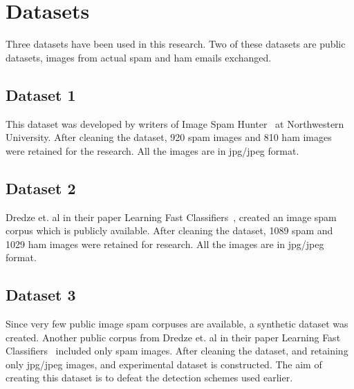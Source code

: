 \chapter{Datasets}
Three datasets have been used in this research. Two of these datasets are public datasets, images from actual spam and ham emails exchanged. 

\section{Dataset 1}
This dataset was developed by writers of Image Spam Hunter~\cite{3} at Northwestern University. After cleaning the dataset, 920 spam images and 810 ham images were retained for the research. All the images are in jpg/jpeg format.

\section{Dataset 2}
Dredze et. al in their paper Learning Fast Classifiers~\cite{10}, created an image spam corpus which is publicly available. After cleaning the dataset,  
1089 spam and 1029 ham images were retained for research. All the images are in jpg/jpeg format.

\section{Dataset 3}
Since very few public image spam corpuses are available, a synthetic dataset was created. Another public corpus from Dredze et. al in their paper Learning Fast Classifiers~\cite{10} included only spam images. After cleaning the dataset, and retaining only jpg/jpeg images, and experimental dataset is constructed. The aim of creating this dataset is to defeat the detection schemes used earlier. 



